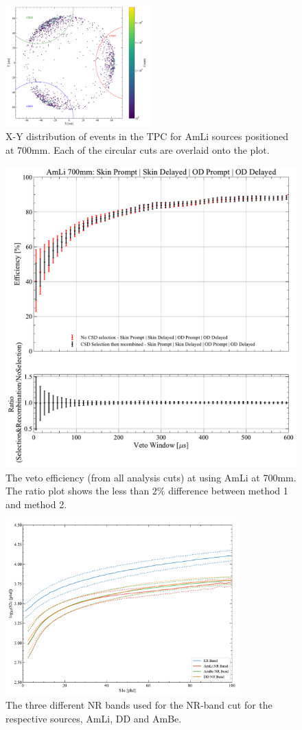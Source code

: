 \begin{figure}
	\centering
	\includegraphics[width=0.5\textwidth]{figures/VetoEfficiency/CircularCSDCut.pdf}
	\caption{X-Y distribution of events in the TPC for AmLi sources positioned at 700mm. Each of the circular cuts are overlaid onto the plot.}
	\label{fig:CSDSelection}
\end{figure}
\begin{figure}
	\centering
	\includegraphics[width=0.5\linewidth]{figures/VetoEfficiency/AmLi_700mm_Total_CSDSelection.pdf}
	\caption{The veto efficiency (from all analysis cuts) at using AmLi at 700mm. The ratio plot shows the less than $2\%$ difference between method 1 and method 2.}
	\label{fig:CSDSelectionEffComp}
\end{figure}
\begin{figure}
	\centering
	\includegraphics[width=0.8\textwidth]{figures/VetoEfficiency/SR3NRBands.pdf}
	\caption{The three different NR bands used for the NR-band cut for the respective sources, AmLi, DD and AmBe.}
	\label{fig:SR3NRBands}
\end{figure}

